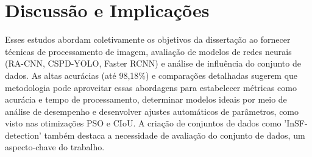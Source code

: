 \section{Discussão e Implicações}
Esses estudos abordam coletivamente os objetivos da dissertação ao fornecer técnicas de processamento de imagem, avaliação de modelos de redes neurais (RA-CNN, CSPD-YOLO, Faster RCNN) e análise de influência do conjunto de dados. As altas acurácias (até 98,18\%) e comparações detalhadas sugerem que metodologia pode aproveitar essas abordagens para estabelecer métricas como acurácia e tempo de processamento, determinar modelos ideais por meio de análise de desempenho e desenvolver ajustes automáticos de parâmetros, como visto nas otimizações PSO e CIoU. A criação de conjuntos de dados como 'InSF-detection' também destaca a necessidade de avaliação do conjunto de dados, um aspecto-chave do trabalho.


